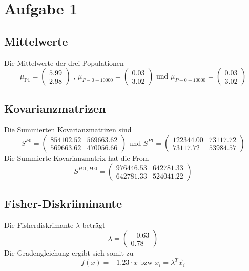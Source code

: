 \section*{Aufgabe 1}
\subsection*{Mittelwerte}

Die Mittelwerte der drei Populationen 
\begin{equation}
  \mu_\text{P1} = \begin{pmatrix} 5.99 \\ 2.98 \end{pmatrix} \text{ , } \mu_{P-0-10000} = \begin{pmatrix} 0.03 \\ 3.02 \end{pmatrix} \text{ und } \mu_{P-0-10000} = \begin{pmatrix} 0.03 \\ 3.02 \end{pmatrix}
\end{equation}
\subsection*{Kovarianzmatrizen}
Die Summierten Kovarianzmatrizen sind
\begin{equation}
  S^{P0} = \begin{pmatrix} 854102.52 & 569663.62 \\ 569663.62 & 470056.66 \end{pmatrix} \text{ und } S^{P1} = \begin{pmatrix} 122344.00 & 73117.72 \\ 73117.72 & 53984.57 \end{pmatrix}
\end{equation}
Die Summierte Kovarianzmatrix hat die From
\begin{equation}
  S^{P01,P00} = \begin{pmatrix} 976446.53 & 642781.33 \\ 642781.33 & 524041.22 \end{pmatrix}
\end{equation}
\subsection*{Fisher-Diskriiminante}
Die Fisherdiskrimante $\lambda$ beträgt 
\begin{equation}
  \lambda = \begin{pmatrix} -0.63 \\ 0.78 \end{pmatrix}
\end{equation}
Die Gradengleichung ergibt sich somit zu
\begin{equation}
  f(x) = -1.23 \cdot x \text{    bzw    } x_i = \lambda^T \vec{x}_i
\end{equation}
